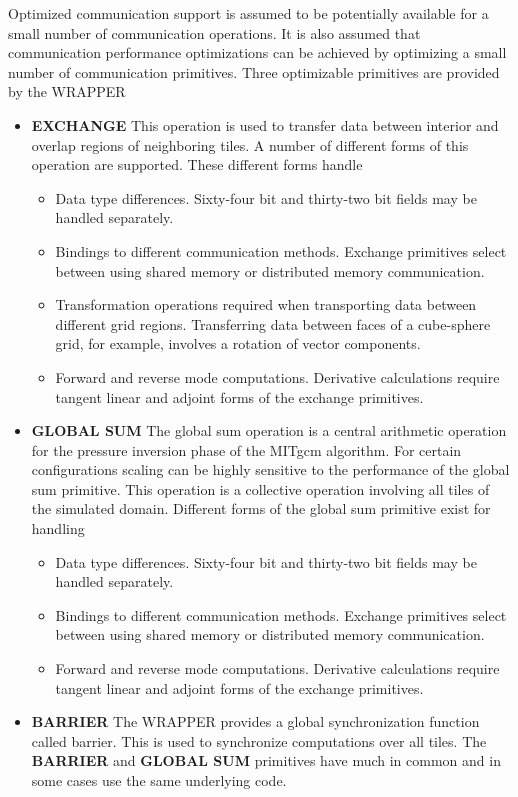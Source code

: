 Optimized communication support is assumed to be potentially available
for a small number of communication operations.  It is also assumed
that communication performance optimizations can be achieved by
optimizing a small number of communication primitives.  Three
optimizable primitives are provided by the WRAPPER
\begin{itemize}
\item{\bf EXCHANGE} This operation is used to transfer data between
  interior and overlap regions of neighboring tiles. A number of
  different forms of this operation are supported. These different
  forms handle
  \begin{itemize}
  \item Data type differences. Sixty-four bit and thirty-two bit
    fields may be handled separately.
  \item Bindings to different communication methods.  Exchange
    primitives select between using shared memory or distributed
    memory communication.
  \item Transformation operations required when transporting data
    between different grid regions. Transferring data between faces of
    a cube-sphere grid, for example, involves a rotation of vector
    components.
  \item Forward and reverse mode computations. Derivative calculations
    require tangent linear and adjoint forms of the exchange
    primitives.
  \end{itemize}

\item{\bf GLOBAL SUM} The global sum operation is a central arithmetic
  operation for the pressure inversion phase of the MITgcm algorithm.
  For certain configurations scaling can be highly sensitive to the
  performance of the global sum primitive. This operation is a
  collective operation involving all tiles of the simulated domain.
  Different forms of the global sum primitive exist for handling
  \begin{itemize}
  \item Data type differences. Sixty-four bit and thirty-two bit
    fields may be handled separately.
  \item Bindings to different communication methods.  Exchange
    primitives select between using shared memory or distributed
    memory communication.
  \item Forward and reverse mode computations. Derivative calculations
    require tangent linear and adjoint forms of the exchange
    primitives.
  \end{itemize}
  
\item{\bf BARRIER} The WRAPPER provides a global synchronization
  function called barrier. This is used to synchronize computations
  over all tiles.  The {\bf BARRIER} and {\bf GLOBAL SUM} primitives
  have much in common and in some cases use the same underlying code.
\end{itemize}



